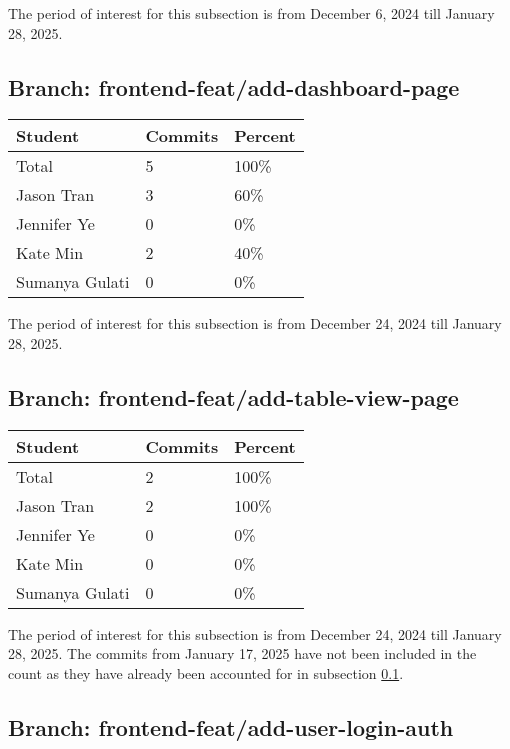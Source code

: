 \documentclass{article}
\begin{document}
The period of interest for this subsection is from December 6, 2024 till January 28, 2025. 

\subsection{Branch: frontend-feat/add-dashboard-page} \label{sec:dashboard}

\begin{table}[H]
\centering
\begin{tabular}{lll}
\toprule
\textbf{Student} & \textbf{Commits} & \textbf{Percent}\\
\midrule
Total & 5 & 100\% \\
Jason Tran & 3 & 60\% \\
Jennifer Ye & 0 & 0\% \\
Kate Min & 2 & 40\% \\
Sumanya Gulati & 0 & 0\% \\
\bottomrule
\end{tabular}
\end{table}

The period of interest for this subsection is from December 24, 2024 till January 28, 2025. 

\subsection{Branch: frontend-feat/add-table-view-page} \label{sec:tableview}

\begin{table}[H]
\centering
\begin{tabular}{lll}
\toprule
\textbf{Student} & \textbf{Commits} & \textbf{Percent}\\
\midrule
Total & 2 & 100\% \\
Jason Tran & 2 & 100\% \\
Jennifer Ye & 0 & 0\% \\
Kate Min & 0 & 0\% \\
Sumanya Gulati & 0 & 0\% \\
\bottomrule
\end{tabular}
\end{table}

The period of interest for this subsection is from December 24, 2024 till January 28, 2025. The commits 
from January 17, 2025 have not been included in the count as they have already been 
accounted for in subsection \ref{sec:dashboard}.

\subsection{Branch: frontend-feat/add-user-login-auth} \label{sec:login}
\end{document}
